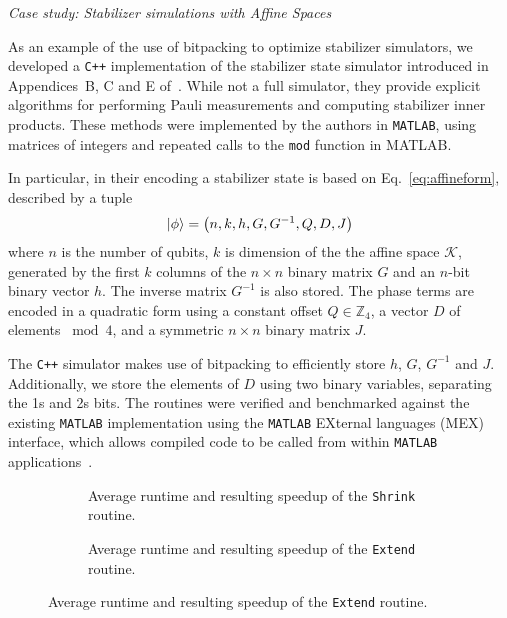 \large{\itshape{Case study: Stabilizer simulations with Affine Spaces}}\par
As an example of the use of bitpacking to optimize stabilizer simulators, we developed a \texttt{C++} implementation of the stabilizer state simulator introduced in Appendices~B, C and E of~\cite{Bravyi2016}. While not a full simulator, they provide explicit algorithms for performing Pauli measurements and computing stabilizer inner products. These methods were implemented by the authors in \texttt{MATLAB}, using matrices of integers and repeated calls to the \texttt{mod} function in MATLAB.\par
In particular, in their encoding a stabilizer state is based on Eq.~\ref{eq:affineform}, described by a tuple
\[\ket{\phi} = \left(n, k, h, G, G^{-1}, Q, D, J\right)\]
where $n$ is the number of qubits, $k$ is dimension of the the affine space $\mathcal{K}$, generated by the first $k$ columns of the $n\times n$ binary matrix $G$ and an $n$-bit binary vector $h$. The inverse matrix $G^{-1}$ is also stored. The phase terms are encoded in a quadratic form using a constant offset $Q\in\mathbb{Z}_{4}$, a vector $D$ of elements $\bmod{4}$, and a symmetric $n\times n$ binary matrix $J$.\par
The \texttt{C++} simulator makes use of bitpacking to efficiently store $h$, $G$, $G^{-1}$ and $J$. Additionally, we store the elements of $D$ using two binary variables, separating the 1s and 2s bits. The routines were verified and benchmarked against the existing \texttt{MATLAB} implementation using the \texttt{MATLAB} EXternal languages (MEX) interface, which allows compiled code to be called from within \texttt{MATLAB} applications~\cite{MEXRef}.\par
\begin{figure}[p]
\centering
\caption{Figures showing the performance of the \texttt{MATLAB} and \texttt{C++} implementations of a stabilize simulator based on Affine Spaces.}
\label{fig:affine_timings}
\begin{subfigure}[t]{0.9\textwidth}
    \begin{scaletikzpicturetowidth}{\textwidth}
        
    \end{scaletikzpicturetowidth}
    \caption{Average runtime and resulting speedup of the \texttt{Shrink} routine.}
\end{subfigure}
\begin{subfigure}[t]{0.9\textwidth}
    \caption{Average runtime and resulting speedup of the \texttt{Extend} routine.}
    \begin{scaletikzpicturetowidth}{\textwidth}
        
    \end{scaletikzpicturetowidth}
\end{subfigure}
\end{figure}
